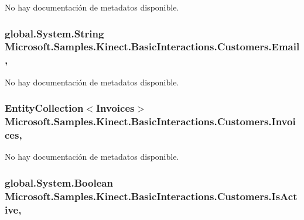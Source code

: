 No hay documentación de metadatos disponible. 

\hypertarget{class_microsoft_1_1_samples_1_1_kinect_1_1_basic_interactions_1_1_customers_a56255c40b2f61130aa26beab94237aa3}{
\subsubsection[{Email}]{\setlength{\rightskip}{0pt plus 5cm}global.\-System.\-String Microsoft.\-Samples.\-Kinect.\-Basic\-Interactions.\-Customers.\-Email\hspace{0.3cm}{\ttfamily [get]}, {\ttfamily [set]}}}\label{class_microsoft_1_1_samples_1_1_kinect_1_1_basic_interactions_1_1_customers_a56255c40b2f61130aa26beab94237aa3}


No hay documentación de metadatos disponible. 

\hypertarget{class_microsoft_1_1_samples_1_1_kinect_1_1_basic_interactions_1_1_customers_a922b8938af87c9f0973d7bfd98085364}{
\subsubsection[{Invoices}]{\setlength{\rightskip}{0pt plus 5cm}Entity\-Collection$<${\bf Invoices}$>$ Microsoft.\-Samples.\-Kinect.\-Basic\-Interactions.\-Customers.\-Invoices\hspace{0.3cm}{\ttfamily [get]}, {\ttfamily [set]}}}\label{class_microsoft_1_1_samples_1_1_kinect_1_1_basic_interactions_1_1_customers_a922b8938af87c9f0973d7bfd98085364}


No hay documentación de metadatos disponible. 

\hypertarget{class_microsoft_1_1_samples_1_1_kinect_1_1_basic_interactions_1_1_customers_ab5e7651a1c97aa115d93b166122217df}{
\subsubsection[{Is\-Active}]{\setlength{\rightskip}{0pt plus 5cm}global.\-System.\-Boolean Microsoft.\-Samples.\-Kinect.\-Basic\-Interactions.\-Customers.\-Is\-Active\hspace{0.3cm}{\ttfamily [get]}, {\ttfamily [set]}}}\label{class_microsoft_1_1_samples_1_1_kinect_1_1_basic_interactions_1_1_customers_ab5e7651a1c97aa115d93b166122217df}


